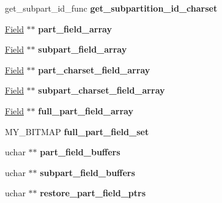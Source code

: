 \begin{DoxyCompactItemize}
get\+\_\+subpart\+\_\+id\+\_\+func {\bfseries get\+\_\+subpartition\+\_\+id\+\_\+charset}
\item 
\mbox{\label{classpartition__info_a6ad9f488b0a488b3afe890218b8e8fca}} 
\mbox{\hyperlink{classField}{Field}} $\ast$$\ast$ {\bfseries part\+\_\+field\+\_\+array}
\item 
\mbox{\label{classpartition__info_a79a1d4446db44811c1cbd847f4ca0780}} 
\mbox{\hyperlink{classField}{Field}} $\ast$$\ast$ {\bfseries subpart\+\_\+field\+\_\+array}
\item 
\mbox{\label{classpartition__info_a2d30cf87c0c4812a60e06837cde4a909}} 
\mbox{\hyperlink{classField}{Field}} $\ast$$\ast$ {\bfseries part\+\_\+charset\+\_\+field\+\_\+array}
\item 
\mbox{\label{classpartition__info_a5a0e2ee1a6d5a702d13988afea2f9479}} 
\mbox{\hyperlink{classField}{Field}} $\ast$$\ast$ {\bfseries subpart\+\_\+charset\+\_\+field\+\_\+array}
\item 
\mbox{\label{classpartition__info_aeae86bc7ab3dd1969589ae2b912dc7e2}} 
\mbox{\hyperlink{classField}{Field}} $\ast$$\ast$ {\bfseries full\+\_\+part\+\_\+field\+\_\+array}
\item 
\mbox{\label{classpartition__info_a46aef1cd4bf917eb14c8f9959bc047f0}} 
M\+Y\+\_\+\+B\+I\+T\+M\+AP {\bfseries full\+\_\+part\+\_\+field\+\_\+set}
\item 
\mbox{\label{classpartition__info_a11503d9e5e1988fa1fe5f1da5638bf81}} 
uchar $\ast$$\ast$ {\bfseries part\+\_\+field\+\_\+buffers}
\item 
\mbox{\label{classpartition__info_a9520447e380d5f513c6923b3ed772d55}} 
uchar $\ast$$\ast$ {\bfseries subpart\+\_\+field\+\_\+buffers}
\item 
\mbox{\label{classpartition__info_a780bbb0eacf35e14fa315cdacf24ea66}} 
uchar $\ast$$\ast$ {\bfseries restore\+\_\+part\+\_\+field\+\_\+ptrs}
\item 
\mbox{\label{classpartition__info_ae04b56bff31a713f4d02ac293f837a7f}} 

\end{DoxyCompactItemize}
